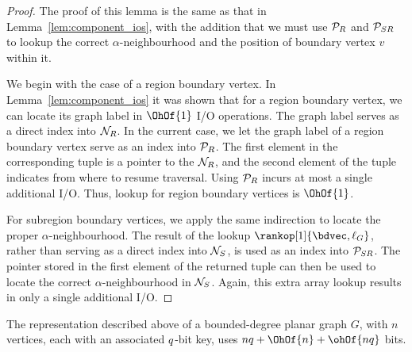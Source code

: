 \begin{proof}
The proof of this lemma is the same as that in 
Lemma~\ref{lem:component_ios}, with the addition that we must
use $\mathcal{P}_R$ and $\mathcal{P}_{SR}$ to lookup the correct 
$\alpha$-neighbourhood and the position of boundary vertex $v$
within it.

We begin with the case of a region boundary vertex.
In Lemma~\ref{lem:component_ios} it was shown that for a region
boundary vertex, we can locate its graph label in $\OhOf{1}$ I/O
operations.
The graph label serves as a direct index into $\mathcal{N}_R$.
In the current case, we let the graph label of a region boundary
vertex serve as an index into $\mathcal{P}_R$.
The first element in the corresponding tuple is a pointer to the
$\mathcal{N}_R$, and the second element of the tuple indicates from where
to resume traversal.
Using $\mathcal{P}_R$ incurs at most a single additional I/O.
Thus, lookup for region boundary vertices is $\OhOf{1}$.

For subregion boundary vertices, we apply the same indirection
to locate the proper $\alpha$-neighbourhood.
The result of the lookup $\rankop[1]{\bdvec, \ell_G}$, rather
than serving as a direct index into $\mathcal{N}_S$, is used 
as an index into $\mathcal{P}_{SR}$.
The pointer stored in the first element of the returned
tuple can then be used to locate the correct $\alpha$-neighbourhood
in $\mathcal{N}_S$. 
Again, this extra array lookup results in only a single 
additional I/O.
\end{proof}

\begin{lemma}\label{lem:cycle_sep_space}
  The representation described above of a bounded-degree planar graph $G$,
  with $n$ vertices, each with an associated $q$-bit key, uses 
  $n\bitsPerKey + \OhOf{n} + \ohOf{n\bitsPerKey}$ bits.
\end{lemma}

